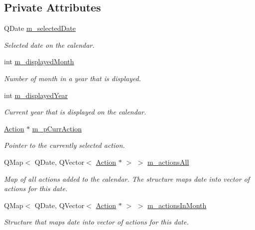 \subsection*{Private Attributes}
\begin{DoxyCompactItemize}
\item 
Q\-Date \hyperlink{class_actions_calendar_a27243b1e4fc38882d61edbba4144d6ba}{m\-\_\-selected\-Date}
\begin{DoxyCompactList}\small\item\em Selected date on the calendar. \end{DoxyCompactList}\item 
int \hyperlink{class_actions_calendar_ae56427a30d84117a575881cce12a0df5}{m\-\_\-displayed\-Month}
\begin{DoxyCompactList}\small\item\em Number of month in a year that is displayed. \end{DoxyCompactList}\item 
int \hyperlink{class_actions_calendar_a547c91e076bb2e6749163ce7ea56676e}{m\-\_\-displayed\-Year}
\begin{DoxyCompactList}\small\item\em Current year that is displayed on the calendar. \end{DoxyCompactList}\item 
\hyperlink{class_action}{Action} $\ast$ \hyperlink{class_actions_calendar_a5734f7c421b4e06e4f7b5fe29c9707e3}{m\-\_\-p\-Curr\-Action}
\begin{DoxyCompactList}\small\item\em Pointer to the currently selected action. \end{DoxyCompactList}\item 
Q\-Map$<$ Q\-Date, Q\-Vector$<$ \hyperlink{class_action}{Action} $\ast$ $>$ $>$ \hyperlink{class_actions_calendar_af0f496503f8aff7dc3edbb0fdf3310b4}{m\-\_\-actions\-All}
\begin{DoxyCompactList}\small\item\em Map of all actions added to the calendar. The structure maps date into vector of actions for this date. \end{DoxyCompactList}\item 
Q\-Map$<$ Q\-Date, Q\-Vector$<$ \hyperlink{class_action}{Action} $\ast$ $>$ $>$ \hyperlink{class_actions_calendar_a82967fe853474c848bc2223e4c6985fa}{m\-\_\-actions\-In\-Month}
\begin{DoxyCompactList}\small\item\em Structure that maps date into vector of actions for this date. \end{DoxyCompactList}\end{DoxyCompactItemize}
